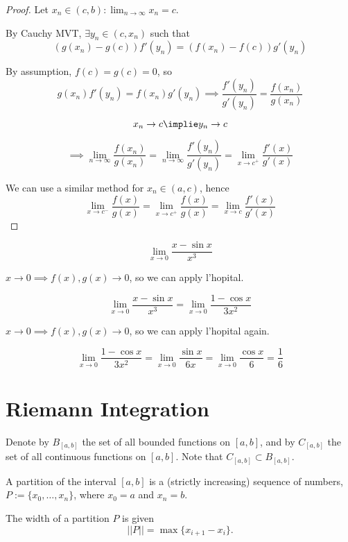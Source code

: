 \documentclass[a4paper,10pt]{article}
\begin{document}
\begin{proof}
	Let $x_n \in (c,b) : \lim_{n \to \infty} x_n = c$.

	By Cauchy MVT, $\exists y_n \in (c, x_n)$ such that
	\[ (g(x_n) - g(c))f'(y_n) = (f(x_n) - f(c))g'(y_n) \]

	By assumption, $f(c) = g(c) = 0$, so
	\[
		g(x_n)f'(y_n) = f(x_n)g'(y_n)
		\implies
		\frac{f'(y_n)}{g'(y_n)} = \frac{f(x_n)}{g(x_n)}
	\]

	\[ x_n \to c \implie y_n \to c \]

	\[
		\implies
		\lim_{n \to \infty}\frac{f(x_n)}{g(x_n)}
		= \lim_{n \to \infty}\frac{f'(y_n)}{g'(y_n)}
		= \lim_{x \to c^+}\frac{f'(x)}{g'(x)}
	\]

	We can use a similar method for $x_n \in (a,c)$, hence
	\[
		\lim_{x \to c^-}\frac{f(x)}{g(x)}
		= \lim_{x \to c^+}\frac{f(x)}{g(x)}
		= \lim_{x \to c}\frac{f'(x)}{g'(x)}
	\]
\end{proof}

\begin{ex}
	\[ \lim_{x \to 0} \frac{x - \sin x}{x^3} \]

	$x \to 0 \implies f(x), g(x) \to 0$, so we can apply l'hopital.

	\[
		\lim_{x \to 0} \frac{x - \sin x}{x^3}
		= \lim_{x \to 0} \frac{1 - \cos x}{3x^2}
	\]

	$x \to 0 \implies f(x), g(x) \to 0$, so we can apply l'hopital again.

	\[
		\lim_{x \to 0} \frac{1 - \cos x}{3x^2}
		= \lim_{x \to 0} \frac{\sin x}{6x}
		= \lim_{x \to 0} \frac{\cos x}{6}
		= \frac{1}{6}
	\]

\end{ex}

\section{Riemann Integration}

Denote by $B_{[a,b]}$ the set of all bounded functions on $[a,b]$, and
by $C_{[a,b]}$ the set of all continuous functions on $[a,b]$. Note that
$C_{[a,b]} \subset B_{[a,b]}$.

\begin{defn}[Partition]
	A partition of the interval $[a,b]$ is a (strictly increasing)
	sequence of numbers, $P := \{x_0, \ldots, x_n\}$, where $x_0 = a$
	and $x_n = b$.
\end{defn}

\begin{defn}
	The width of a partition $P$ is given
	\[ ||P|| = \max\{x_{i+1} - x_i\}.\]
\end{defn}
\end{document}
